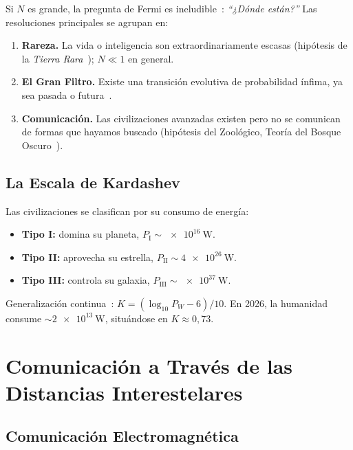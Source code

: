 \documentclass[12pt,a4paper]{article}
\begin{document}
Si $N$ es grande, la pregunta de Fermi es ineludible~\citep{Hart1975}: \textit{``¿Dónde están?''}
Las resoluciones principales se agrupan en:
\begin{enumerate}[noitemsep]
  \item \textbf{Rareza.} La vida o inteligencia son extraordinariamente
    escasas (hipótesis de la \emph{Tierra Rara}~\citep{WardBrownlee2000}); $N \ll 1$ en general.
  \item \textbf{El Gran Filtro.} Existe una transición evolutiva de
    probabilidad ínfima, ya sea pasada o futura~\citep{Hanson1998}.
  \item \textbf{Comunicación.} Las civilizaciones avanzadas existen pero
    no se comunican de formas que hayamos buscado (hipótesis del Zoológico,
    Teoría del Bosque Oscuro~\citep{Liu2008}).
\end{enumerate}

\subsection{La Escala de Kardashev}
\label{sec:kardashev_es}

Las civilizaciones se clasifican por su consumo de energía:
\begin{itemize}[noitemsep]
  \item \textbf{Tipo I:} domina su planeta, $P_{\mathrm{I}} \sim \SI{e16}{\watt}$.
  \item \textbf{Tipo II:} aprovecha su estrella, $P_{\mathrm{II}} \sim \SI{4e26}{\watt}$.
  \item \textbf{Tipo III:} controla su galaxia, $P_{\mathrm{III}} \sim \SI{e37}{\watt}$.
\end{itemize}
Generalización continua~\citep{Sagan1973}: $K = (\log_{10} P_W - 6)/10$.
En 2026, la humanidad consume $\sim \SI{2e13}{\watt}$, situándose en $K \approx 0{,}73$.

\section[Comunicación a Través de las Distancias Interestelares]{Comunicación a Través de las\\Distancias Interestelares}

\subsection{Comunicación Electromagnética}
\end{document}
